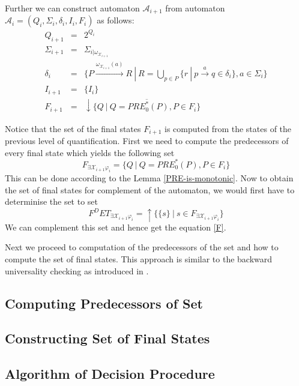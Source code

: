 Further we can construct automaton $\mathcal{A}_{i+1}$ from automaton
$\mathcal{A}_i = (Q_i, \Sigma_i, \delta_i, I_i, F_i)$ as follows:
\begin{eqnarray}
 Q_{i+1} & = & 2^{Q_i}\\
 \Sigma_{i+1} & = & \Sigma_{i|\omega_{\mathcal{X}_{i+1}}}\\
 \delta_i & = & \{P \overset{\omega_{\mathcal{X}_{i+1}}(a)}{\longrightarrow} R\
 |\ R = \bigcup_{p \in P} \{r\ |\ p \overset{a}{\rightarrow} q \in \delta_i\}, a \in
 \Sigma_i\}\\
 I_{i+1} & = & \{I_i\}\\
 F_{i+1} & = & \downarrow\overline{\{Q\ |\ Q = PRE_0^*(P), P \in F_i\}}
\end{eqnarray}

Notice that the set of the final states $F_{i+1}$ is computed from the states of
the previous level of quantification. First we need to compute the predecessors
of every final state which yields the following set
\begin{equation}
 F_{\exists\mathcal{X}_{i+1}\varphi_i} = \{Q\ |\ Q = PRE_0^*(P), P \in F_i\}
\end{equation}
This can be done according to the Lemma \ref{PRE-is-monotonic}. Now to obtain
the set of final states for complement of the automaton, we would first have to
determinise the set to set
\begin{equation}
 F^DET_{\exists\mathcal{X}_{i+1}\varphi_i} = \uparrow\{ \{s\}\ |\ s \in
 F_{\exists\mathcal{X}_{i+1}\varphi_i}\}
\end{equation}
We can complement this set and hence get the equation \ref{F}.

Next we proceed to computation of the predecessors of the set and how to compute
the set of final states. This approach is similar to the backward universality
checking as introduced in \cite{backwards-universality}.

\subsection{Computing Predecessors of Set}

\subsection{Constructing Set of Final States}\label{final-states}

\subsection{Algorithm of Decision Procedure}

